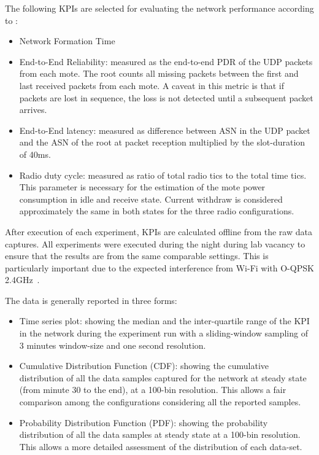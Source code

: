 \documentclass[journal]{IEEEtran}
\newcommand{\oqpsk}        {O-QPSK 2.4GHz}
\begin{document}
The following KPIs are selected for evaluating the network performance according to \cite{vucinic20key}:
\begin{itemize}
\item Network Formation Time
\item End-to-End Reliability: measured as the end-to-end PDR of the UDP packets from each mote. The root counts all missing packets between the first and last received packets from each mote. A caveat in this metric is that if packets are lost in sequence, the loss is not detected until a subsequent packet arrives. 
\item End-to-End latency: measured as difference between ASN in the UDP packet and the ASN of the root at packet reception multiplied by the slot-duration of 40ms. 
\item Radio duty cycle:  measured as ratio of total radio tics to the total time tics. This parameter is necessary for the estimation of the mote power consumption in idle and receive state. Current withdraw is considered approximately the same in both states for the three radio configurations.  
\end{itemize}

After execution of each experiment, KPIs are calculated offline from the raw data captures. 
All experiments were executed during the night during lab vacancy to ensure that the results are from the same comparable settings. 
This is particularly important due to the expected interference from Wi-Fi with \oqpsk\ \cite{munoz18overview}.

The data is generally reported in three forms:
\begin{itemize}
    \item Time series plot: showing the median and the inter-quartile range of the KPI in the network during the experiment run with a sliding-window sampling of 3 minutes window-size and one second resolution. 
    \item Cumulative Distribution Function (CDF): showing the cumulative distribution of all the data samples captured for the network at steady state (from minute 30 to the end), at a 100-bin resolution. This allows a fair comparison among the configurations considering all the reported samples.
    \item Probability Distribution Function (PDF): showing the probability distribution of all the data samples at steady state at a 100-bin resolution. This allows a more detailed assessment of the distribution of each data-set. 
\end{itemize}
\end{document}
